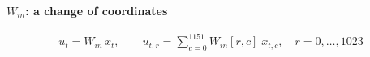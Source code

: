 \documentclass[border=40pt]{standalone}
\begin{document}
\begin{minipage}{26cm}
{\sffamily\bfseries\Large\color{muted} $W_{in}$: a change of coordinates}\par\vspace{-14pt}
{\LARGE
\begin{gather*}
u_t = W_{in}\,x_t, \qquad u_{t,r} = \sum_{c=0}^{1151} W_{in}[r,c]\;x_{t,c}, \quad r = 0,\dots,1023
\end{gather*}}
\end{minipage}
\end{document}
